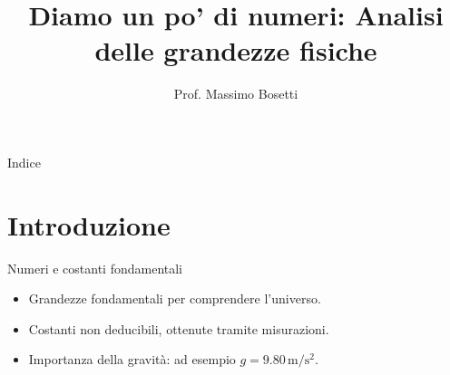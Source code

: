 \documentclass[9pt]{beamer}
\title{Diamo un po' di numeri: Analisi delle grandezze fisiche}
\subtitle{}
\author{Prof. Massimo Bosetti}
\institute{Liceo da Vinci}
\date{}
\begin{document}
\begin{frame}
    \titlepage
\end{frame}

\begin{frame}{Indice}
    \tableofcontents
\end{frame}

\section{Introduzione}
\begin{frame}{Numeri e costanti fondamentali}
    \begin{itemize}
        \item Grandezze fondamentali per comprendere l'universo.
        \item Costanti non deducibili, ottenute tramite misurazioni.
        \item Importanza della gravità: ad esempio $g = 9.80 \, \mathrm{m/s^2}$.
    \end{itemize}
\end{frame}

\end{document}
